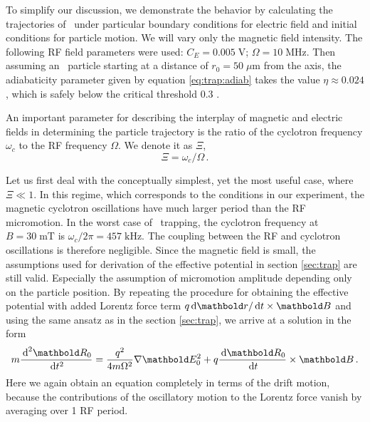 To simplify our discussion, we demonstrate the behavior by calculating
the trajectories of \Hminus\ under particular
boundary conditions for electric field and initial conditions
for particle motion. We will vary only the magnetic field
intensity. The following \ac{RF} field
parameters were used:
$C_E = 0.005\;\text{V}$; $\Omega=10\;\text{MHz}$.
Then assuming an \Hminus\ particle starting
at a distance of $r_0=50\;\mu\text{m}$ from the
axis, the adiabaticity parameter given by equation
\eqref{eq:trap:adiab} takes the value $\eta\approx 0.024$, which
is safely below the critical threshold $0.3$ \citep{gerlich1992}.

An important parameter for describing the interplay of magnetic
and electric fields in determining the particle trajectory is
the ratio of the cyclotron frequency $\omega_c$ to the \ac{RF}
frequency $\Omega$. We denote it as $\Xi$,
\begin{equation}
\Xi = \omega_c/\Omega\,.
\end{equation}

Let us first deal with the conceptually simplest, yet the most
useful case, where $\Xi \ll 1$. In this regime, which corresponds
to the conditions in our experiment, the magnetic
cyclotron oscillations have much larger period than the \ac{RF}
micromotion. In the worst case of \Hminus\ trapping,
the cyclotron frequency at $B=30\;\text{mT}$ is
$\omega_c/2\pi=457\;\text{kHz}$. The coupling between the \ac{RF}
 and cyclotron oscillations is therefore negligible. Since the
magnetic field is small, the assumptions used for derivation
of the effective potential in section \ref{sec:trap} are still
valid. Especially the assumption of micromotion amplitude
depending only on the particle position. By repeating the procedure
for obtaining the effective potential with added Lorentz
force term $q\de\mb r/\de t\times \mb B$ and using the same
ansatz as in the section \ref{sec:trap}, we arrive
at a solution in the form
\begin{equation}
m\frac{\de^2\mb R_0}{\de t^2} =
\frac{q^2}{4m\Omega^2}\nabla\mb E_0^2 +
q\frac{\de \mb R_0}{\de t}\times \mb B\,.
\label{eq:esmpt:secular}
\end{equation}
Here we again obtain an equation completely in terms of the
drift motion, because the contributions of the oscillatory
motion to the Lorentz force vanish by averaging over 1 \ac{RF}
period.

